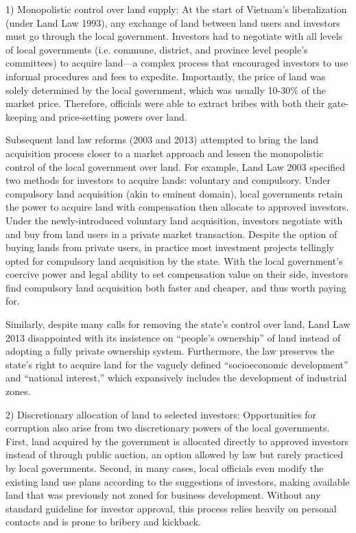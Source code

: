1) Monopolistic control over land supply: At the start of Vietnam's liberalization (under Land Law 1993), any exchange of land between land users and investors must go through the local government. Investors had to negotiate with all levels of local governments (i.e. commune, district, and province level people's committees) to acquire land---a complex process that encouraged investors to use informal procedures and fees to expedite. Importantly, the price of land was solely determined by the local government, which was usually 10-30\% of the market price. Therefore, officials were able to extract bribes with both their gate-keeping and price-setting powers over land.

Subsequent land law reforms (2003 and 2013) attempted to bring the land acquisition process closer to a market approach and lessen the monopolistic control of the local government over land. For example, Land Law 2003 specified two methods for investors to acquire lands: voluntary and compulsory. Under compulsory land acquisition (akin to eminent domain), local governments retain the power to acquire land with compensation then allocate to approved investors. Under the newly-introduced voluntary land acquisition, investors negotiate with and buy from land users in a private market transaction. Despite the option of buying lands from private users, in practice most investment projects tellingly opted for compulsory land acquisition by the state. With the local government's coercive power and legal ability to set compensation value on their side, investors find compulsory land acquisition both faster and cheaper, and thus worth paying for.

Similarly, despite many calls for removing the state's control over land, Land Law 2013 disappointed with its insistence on ``people's ownership'' of land instead of adopting a fully private ownership system. Furthermore, the law preserves the state's right to acquire land for the vaguely defined ``socioeconomic development'' and ``national interest,'' which expansively includes the development of industrial zones.

2) Discretionary allocation of land to selected investors: Opportunities for corruption also arise from two discretionary powers of the local governments. First, land acquired by the government is allocated directly to approved investors instead of through public auction, an option allowed by law but rarely practiced by local governments. Second, in many cases, local officials even modify the existing land use plans according to the suggestions of investors, making available land that was previously not zoned for business development. Without any standard guideline for investor approval, this process relies heavily on personal contacts and is prone to bribery and kickback.

